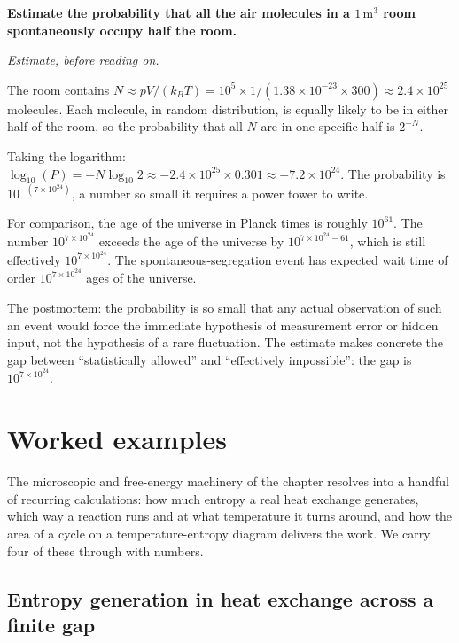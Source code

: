 \begin{estimation}
\textbf{Estimate the probability that all the air molecules in a
$1\,\text{m}^3$ room spontaneously occupy half the room.}

\smallskip
\textit{Estimate, before reading on.}

\smallskip
The room contains $N \approx pV/(k_B T) = 10^5 \times 1/(1.38 \times
10^{-23} \times 300) \approx 2.4 \times 10^{25}$ molecules. Each
molecule, in random distribution, is equally likely to be in either
half of the room, so the probability that all $N$ are in one
specific half is $2^{-N}$.

Taking the logarithm: $\log_{10}(P) = -N \log_{10} 2 \approx -2.4
\times 10^{25} \times 0.301 \approx -7.2 \times 10^{24}$. The
probability is $10^{-(7 \times 10^{24})}$, a number so small it
requires a power tower to write.

For comparison, the age of the universe in Planck times is roughly
$10^{61}$. The number $10^{7 \times 10^{24}}$ exceeds the age of the
universe by $10^{7 \times 10^{24} - 61}$, which is still effectively
$10^{7 \times 10^{24}}$. The spontaneous-segregation event has
expected wait time of order $10^{7 \times 10^{24}}$ ages of the
universe.

The postmortem: the probability is so small that any actual
observation of such an event would force the immediate hypothesis
of measurement error or hidden input, not the hypothesis of a rare
fluctuation. The estimate makes concrete the gap between
``statistically allowed'' and ``effectively impossible'': the gap is
$10^{7 \times 10^{24}}$.
\end{estimation}

\section{Worked examples}

The microscopic and free-energy machinery of the chapter resolves into a
handful of recurring calculations: how much entropy a real heat exchange
generates, which way a reaction runs and at what temperature it turns
around, and how the area of a cycle on a temperature-entropy diagram
delivers the work. We carry four of these through with numbers.

\subsection{Entropy generation in heat exchange across a finite gap}

